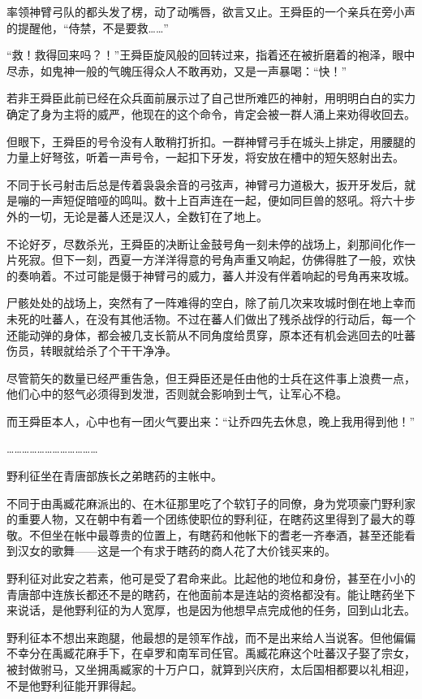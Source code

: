 率领神臂弓队的都头发了楞，动了动嘴唇，欲言又止。王舜臣的一个亲兵在旁小声的提醒他，“侍禁，不是要救……”

“救！救得回来吗？！”王舜臣旋风般的回转过来，指着还在被折磨着的袍泽，眼中尽赤，如鬼神一般的气魄压得众人不敢再劝，又是一声暴喝：“快！”

若非王舜臣此前已经在众兵面前展示过了自己世所难匹的神射，用明明白白的实力确定了身为主将的威严，他现在的这个命令，肯定会被一群人涌上来劝得收回去。

但眼下，王舜臣的号令没有人敢稍打折扣。一群神臂弓手在城头上排定，用腰腿的力量上好弩弦，听着一声号令，一起扣下牙发，将安放在槽中的短矢怒射出去。

不同于长弓射击后总是传着袅袅余音的弓弦声，神臂弓力道极大，扳开牙发后，就是嘣的一声短促暗哑的鸣叫。数十上百声连在一起，便如同巨兽的怒吼。将六十步外的一切，无论是蕃人还是汉人，全数钉在了地上。

不论好歹，尽数杀光，王舜臣的决断让金鼓号角一刻未停的战场上，刹那间化作一片死寂。但下一刻，西夏一方洋洋得意的号角声重又响起，仿佛得胜了一般，欢快的奏响着。不过可能是慑于神臂弓的威力，蕃人并没有伴着响起的号角再来攻城。

尸骸处处的战场上，突然有了一阵难得的空白，除了前几次来攻城时倒在地上幸而未死的吐蕃人，在没有其他活物。不过在蕃人们做出了残杀战俘的行动后，每一个还能动弹的身体，都会被几支长箭从不同角度给贯穿，原本还有机会逃回去的吐蕃伤员，转眼就给杀了个干干净净。

尽管箭矢的数量已经严重告急，但王舜臣还是任由他的士兵在这件事上浪费一点，他们心中的怒气必须得到发泄，否则就会影响到士气，让军心不稳。

而王舜臣本人，心中也有一团火气要出来：“让乔四先去休息，晚上我用得到他！”

………………………………

野利征坐在青唐部族长之弟瞎药的主帐中。

不同于由禹臧花麻派出的、在木征那里吃了个软钉子的同僚，身为党项豪门野利家的重要人物，又在朝中有着一个团练使职位的野利征，在瞎药这里得到了最大的尊敬。不但坐在帐中最尊贵的位置上，有瞎药和他帐下的耆老一齐奉酒，甚至还能看到汉女的歌舞——这是一个有求于瞎药的商人花了大价钱买来的。

野利征对此安之若素，他可是受了君命来此。比起他的地位和身份，甚至在小小的青唐部中连族长都还不是的瞎药，在他面前本是连站的资格都没有。能让瞎药坐下来说话，是他野利征的为人宽厚，也是因为他想早点完成他的任务，回到山北去。

野利征本不想出来跑腿，他最想的是领军作战，而不是出来给人当说客。但他偏偏不幸分在禹臧花麻手下，在卓罗和南军司任官。禹臧花麻这个吐蕃汉子娶了宗女，被封做驸马，又坐拥禹臧家的十万户口，就算到兴庆府，太后国相都要以礼相迎，不是他野利征能开罪得起。

